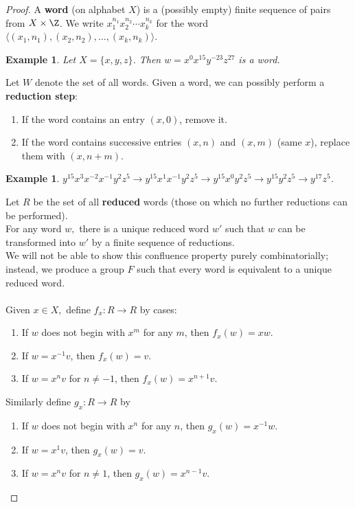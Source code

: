 \documentclass[a4paper,12pt]{article}
\newtheorem{eg}[thm]{Example}
\begin{document}
\begin{proof}
    A \textbf{word} (on alphabet $X$) is a (possibly empty) finite sequence of pairs from $X \times \Z$. We write $x_1^{n_1}x_2^{n_2}\cdots x_k^{n_k}$ for the word $\langle(x_1,n_1),(x_2,n_2),\ldots,(x_k,n_k)\rangle$. 
    \begin{eg}
        Let $X= \{x,y,z\}$. Then $w=x^0 x^{15}y^{-23}z^{27}$ is a word.
    \end{eg}
    \noindent Let $W$ denote the set of all words. Given a word, we can possibly perform a \textbf{reduction step}:
    \begin{enumerate}
        \item If the word contains an entry $(x, 0)$, remove it.
        \item If the word contains successive entries $(x, n)$ and $(x, m)$ (same $x$), replace them with $(x, n+m)$. 
    \end{enumerate}
    \begin{eg}
        $y^{15}x^3x^{-2}x^{-1}y^2z^5\to y^{15}x^1x^{-1}y^2z^5\to y^{15}x^0y^2z^5\to y^{15}y^2z^5\to y^{17}z^5$.
    \end{eg}
    \noindent Let $R$ be the set of all \textbf{reduced} words (those on which no further reductions can be performed). \\
    For any word $w,$ there is a unique reduced word $w'$ such that $w$ can be transformed into $w'$ by a finite sequence of reductions. \\
    We will not be able to show this confluence property purely combinatorially; instead, we produce a group $F$ such that every word is equivalent to a unique reduced word. \\\\
    Given $x\in X,$ define $f_{x}:R\to R$ by cases:
    \begin{enumerate}
        \item If $w$ does not begin with $x^m$ for any $m$, then $f_x(w)=xw$.
        \item If $w=x^{-1}v$, then $f_x(w)=v$.
        \item If $w=x^n v$ for $n\neq -1$, then $f_x(w)=x^{n+1}v$.
    \end{enumerate}
    Similarly define $g_x:R\to R$ by
    \begin{enumerate}
        \item If $w$ does not begin with $x^n$ for any $n$, then $g_x(w)=x^{-1}w$.
        \item If $w=x^1 v$, then $g_x(w)=v$.
        \item If $w=x^n v$ for $n\neq 1$, then $g_x(w)=x^{n-1}v$.

\end{enumerate}
\end{proof}
\end{document}
